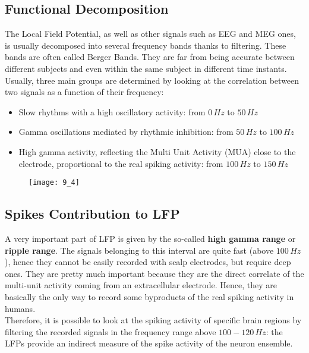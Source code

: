 \subsection{Functional Decomposition}
The Local Field Potential, as well as other signals such as EEG and MEG ones,
is usually decomposed into several frequency bands thanks to filtering.
These bands are often called Berger Bands. They are far from being accurate
between different subjects and even within the same subject in
different time instants. \\
Usually, three main groups are determined by looking at the correlation between
two signals as a function of their frequency:
\begin{itemize}
    \item Slow rhythms with a high oscillatory activity: from \(0\,Hz\) to \(50\,Hz\)
    \item Gamma oscillations mediated by rhythmic inhibition: from \(50\,Hz\)
          to \(100\,Hz\)
    \item High gamma activity, reflecting the Multi Unit Activity (MUA) close
          to the electrode, proportional to the real spiking activity:
          from \(100\,Hz\) to \(150\,Hz\)
\end{itemize}
\begin{figure}[H]
    \texttt{[image: 9\_4]}
    \centering
\end{figure}

\subsection{Spikes Contribution to LFP}
A very important part of LFP is given by the so-called \textbf{high gamma range} or
\textbf{ripple range}. The signals belonging to this interval are quite fast
(above \(100\,Hz\)), hence they cannot be easily recorded with scalp electrodes, but
require deep ones. They are pretty much important because they are the direct
correlate of the multi-unit activity coming from an extracellular electrode. Hence,
they are basically the only way to record some byproducts of the real spiking activity
in humans.\\
Therefore, it is possible to look at the spiking activity of specific brain regions by
filtering the recorded signals in the frequency range above \(100-120\,Hz\): the LFPs
provide an indirect measure of the spike activity of the neuron ensemble.
